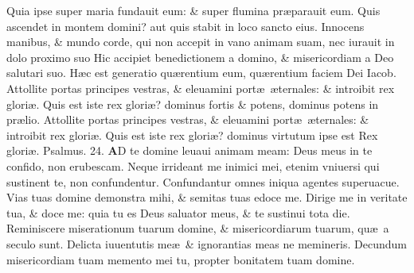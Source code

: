 \documentclass[a5paper,10pt]{book}
\def\ae{æ}
\begin{document}
\begin{multicols*}{2}
\newline \color{red} Q\color{black}uia ipse super maria fundauit eum: \& super flumina pr\ae parauit eum.
\newline \color{red} Q\color{black}uis ascendet in montem domini? aut quis stabit in loco sancto eius.
\newline \color{red} I\color{black}nnocens manibus, \& mundo corde, qui non accepit in vano animam suam, nec iurauit in dolo proximo suo %
\newline \color{red} H\color{black}ic accipiet benedictionem a domino, \& misericordiam a Deo salutari suo.
\newline \color{red} H\color{black}\ae c est generatio qu\ae rentium eum, qu\ae rentium faciem Dei Iacob.
\newline \color{red} A\color{black}ttollite portas principes vestras, \& eleuamini port\ae \ \ae ternales: \& introibit rex glori\ae .
\newline \color{red} Q\color{black}uis est iste rex glori\ae ? dominus fortis \& potens, dominus potens in pr\ae lio.
\newline \color{red} A\color{black}ttollite portas principes vestras, \& eleuamini port\ae \ \ae ternales: \& introibit rex glori\ae .
\newline \color{red} Q\color{black}uis est iste rex glori\ae ? dominus virtutum ipse est Rex glori\ae .
\newline \color{red} Psalmus. \hypertarget{ps24}{24.} \color{black}
\vspace{-.5em}
\lettrine[lines=2]{\bfseries \color{red} A}{}D te domine leuaui animam meam: Deus meus in te confido, non erubescam.
\newline \color{red} N\color{black}eque irrideant me inimici mei, etenim vniuersi qui sustinent te, non confundentur.
\newline \color{red} C\color{black}onfundantur omnes iniqua agentes superuacue.
\newline \color{red} V\color{black}ias tuas domine demonstra mihi, \& semitas tuas edoce me.
\newline \color{red} D\color{black}irige me in veritate tua, \& doce me: quia tu es Deus saluator meus, \& te sustinui tota die.
\newline \color{red} R\color{black}eminiscere miserationum tuarum domine, \& misericordiarum tuarum, qu\ae \ a seculo sunt.
\newline \color{red} D\color{black}elicta iuuentutis me\ae \ \& ignorantias meas ne memineris.
\newline \color{red} D\color{black}ecundum misericordiam tuam memento mei tu, propter bonitatem tuam domine.

\end{multicols*}
\end{document}

